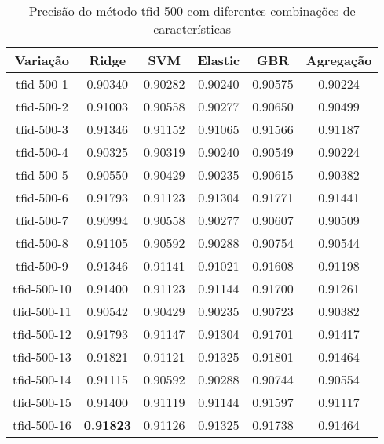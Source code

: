 \begin{table}[H]
\centering
\begin{tabular}{|c| c c  c  c  c| }
\hline
Variação &  Ridge & SVM & Elastic & GBR & Agregação  \\ 
\hline
tfid-500-1 & 0.90340 & 0.90282 & 0.90240 & 0.90575 & 0.90224 \\
\hline
tfid-500-2 & 0.91003 & 0.90558 & 0.90277 & 0.90650 & 0.90499 \\
\hline
tfid-500-3 & 0.91346 & 0.91152 & 0.91065 & 0.91566 & 0.91187 \\
\hline
tfid-500-4 & 0.90325 & 0.90319 & 0.90240 & 0.90549 & 0.90224 \\
\hline
tfid-500-5 & 0.90550 & 0.90429 & 0.90235 & 0.90615 & 0.90382 \\
\hline
tfid-500-6 & 0.91793 & 0.91123 & 0.91304 & 0.91771 & 0.91441 \\
\hline
tfid-500-7 & 0.90994 & 0.90558 & 0.90277 & 0.90607 & 0.90509 \\
\hline
tfid-500-8 & 0.91105 & 0.90592 & 0.90288 & 0.90754 & 0.90544 \\
\hline
tfid-500-9 & 0.91346 & 0.91141 & 0.91021 & 0.91608 & 0.91198 \\
\hline
tfid-500-10 & 0.91400 & 0.91123 & 0.91144 & 0.91700 & 0.91261 \\
\hline
tfid-500-11 & 0.90542 & 0.90429 & 0.90235 & 0.90723 & 0.90382 \\
\hline
tfid-500-12 & 0.91793 & 0.91147 & 0.91304 & 0.91701 & 0.91417 \\
\hline
tfid-500-13 & 0.91821 & 0.91121 & 0.91325 & 0.91801 & 0.91464 \\
\hline
tfid-500-14 & 0.91115 & 0.90592 & 0.90288 & 0.90744 & 0.90554 \\
\hline
tfid-500-15 & 0.91400 & 0.91119 & 0.91144 & 0.91597 & 0.91117 \\
\hline
tfid-500-16 & \textbf{0.91823} & 0.91126 & 0.91325 & 0.91738 & 0.91464 \\
\hline
\end{tabular}
\caption{Precisão do método tfid-500 com diferentes combinações de características}
\label{tab:precisiontfid500}
\end{table}

